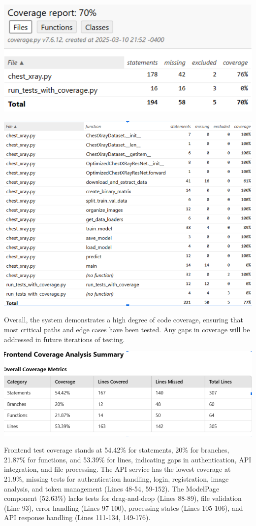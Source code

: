 \documentclass[12pt, titlepage]{article}
\begin{document}
\includegraphics[width=\textwidth]{codecoverage.png}

\includegraphics[width=\textwidth]{tests.png}


Overall, the system demonstrates a high degree of code coverage, ensuring that most critical paths and edge cases have been tested. Any gaps in coverage will be addressed in future iterations of testing.

\includegraphics[width=\textwidth]{overallcoverage.png}


Frontend test coverage stands at 54.42\% for statements, 20\% for branches, 21.87\% for functions, and 53.39\% for lines, indicating gaps in authentication, API integration, and file processing. The API service has the lowest coverage at 21.9\%, missing tests for authentication handling, login, registration, image analysis, and token management (Lines 48-54, 59-152). The ModelPage component (52.63\%) lacks tests for drag-and-drop (Lines 88-89), file validation (Line 93), error handling (Lines 97-100), processing states (Lines 105-106), and API response handling (Lines 111-134, 149-176).
\end{document}
